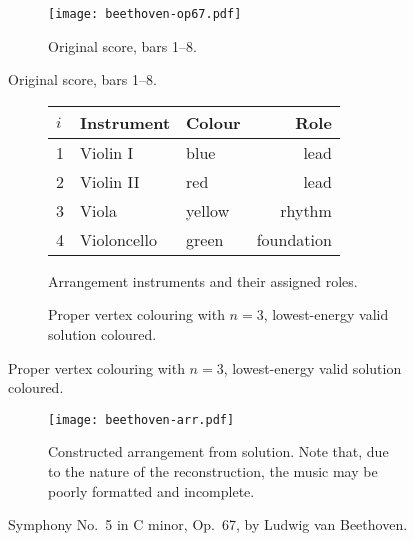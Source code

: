 \documentclass[12pt]{article}
\theoremstyle{definition}
\begin{document}
\begin{figure}[ht]
    \centering
    \begin{subfigure}{\textwidth}
        \texttt{[image: beethoven-op67.pdf]}
        \caption{Original score, bars 1--8.}
    \end{subfigure}
\end{figure}
\begin{figure}[ht]
    \ContinuedFloat
    \centering
    \begin{subfigure}{\textwidth}
        \centering\setlength{\tabcolsep}{12pt}
        \begin{tabular}{lllr}
            \toprule
            $i$ & \textbf{Instrument} & \textbf{Colour} & \textbf{Role} \\
            \midrule
            1 & Violin I & blue & lead \\
            2 & Violin II & red & lead \\
            3 & Viola & yellow & rhythm \\
            4 & Violoncello & green & foundation \\
            \bottomrule
        \end{tabular}
        \caption{Arrangement instruments and their assigned roles.}
    \end{subfigure}
    \begin{subfigure}{\textwidth}
        
        \caption{Proper vertex colouring with $n=3$, lowest-energy valid solution coloured.}
    \end{subfigure}
\end{figure}
\begin{figure}[ht]
    \ContinuedFloat
    \begin{subfigure}{\textwidth}
        \texttt{[image: beethoven-arr.pdf]}
        \caption{Constructed arrangement from solution. Note that, due to the nature of the reconstruction, the music may be poorly formatted and incomplete.}
    \end{subfigure}
    \caption{Symphony No.\ 5 in C minor, Op.\ 67, by Ludwig van Beethoven.}
\end{figure}
\end{document}
